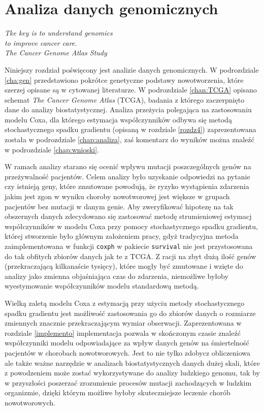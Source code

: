 \chapter{Analiza danych genomicznych}
\begin{flushright}
\textit{Tke key is to understand genomics \\
to improve cancer care. \\
The Cancer Genome Atlas Study
}
\end{flushright}

Niniejszy rozdział poświęcony jest analizie danych genomicznych. W podrozdziale \ref{cha:gen} przedstawiono pokrótce genetyczne podstawy nowotworzenia, które szerzej opisane są w cytowanej literaturze. W podrozdziale \ref{chan:TCGA} opisano schemat \textit{The Cancer Genome Atlas} (TCGA), badania z którego zaczerpnięto dane do analizy biostatystycznej. Analiza przeżycia polegająca na zastosowaniu modelu Coxa, dla którego estymacja współczynników odbywa się metodą stochastycznego spadku gradientu (opisaną w rozdziale \ref{rozdz4}) zaprezentowana została w podrozdziale \ref{chap:analiza}, zaś komentarz do wyników można znaleźć w podrozdziale \ref{chap:wnioski}. 

W ramach analizy starano się ocenić wpływu mutacji poszczególnych genów na przeżywalność pacjentów. Celem analizy było uzyskanie odpowiedzi na pytanie czy istnieją geny, które zmutowane powodują, że ryzyko wystąpienia zdarzenia jakim jest zgon w wyniku choroby nowotworowej jest większe w grupach pacjentów bez mutacji w danym genie. Aby zweryfikować hipotezę na tak obszernych danych zdecydowano się zastosować metodę strumieniowej estymacj współczynników w modelu Coxa przy pomocy stochastycznego spadku gradientu, której stworzenie było głównym założeniem pracy, gdyż tradycyjna metoda zaimplementowana w funkcji \texttt{coxph} w pakiecie \texttt{survival} \cite{survival} nie jest przystosowana do tak obfitych zbiorów danych jak te z TCGA. Z racji na zbyt dużą ilość genów (przekraczającą kilkanaście tysięcy), które mogły być zmutowane i wzięte do analizy jako zmienna objaśniająca czas do zdarzenia, niemożliwe byłoby wyestymowanie współczynników modelu standardową metodą.

Wielką zaletą modelu Coxa z estymacją przy użyciu metody stochastycznego spadku gradientu jest możliwość zastosowania go do zbiorów danych o rozmiarze zmiennych znacznie przekraczającym wymiar obserwacji. Zaprezentowana w rozdziale \ref{implemento} implementacja pozwala w skończonym czasie znaleźć współczynniki modelu odpowiadające za wpływ danych genów na śmiertelność pacjentów w chorobach nowotworowych. Jest to nie tylko zdobycz obliczeniowa ale także ważne narzędzie w analizach biostatystycznych danych dużej skali, które z powodzeniem może zostać wykorzystywane do analizy ludzkiego genomu, tak by w przyszłości poszerzać zrozumienie procesów mutacji zachodzących w ludzkim organizmie, dzięki którym możliwe byłoby skuteczniejsze leczenie chorób nowotworowych.
\newpage
